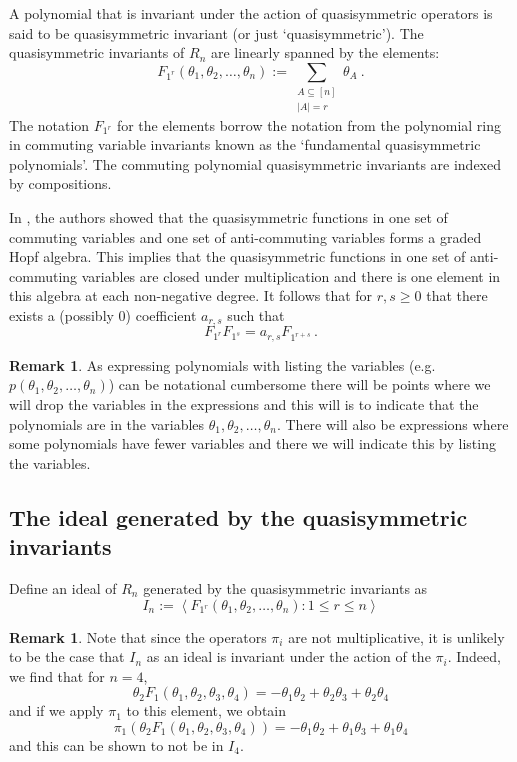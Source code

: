 \documentclass[11pt]{amsart}
\theoremstyle{definition}
\newtheorem{remark}[theorem]{Remark}
\numberwithin{equation}{section}
\begin{document}
A polynomial that is invariant under the action of quasisymmetric operators
is said to be quasisymmetric invariant (or just `quasisymmetric').
The quasisymmetric invariants of $R_n$ are
linearly spanned by the elements:
\begin{equation}\label{eq:defF}
F_{1^r}(\theta_1, \theta_2, \ldots, \theta_n) := \sum_{\substack{A \subseteq [n]\\|A|=r}} \theta_A~.
\end{equation}
The notation $F_{1^r}$ for the elements borrow the notation from the
polynomial ring in commuting variable invariants known as the `fundamental
quasisymmetric polynomials'.  The commuting polynomial quasisymmetric
invariants are indexed by compositions.

In \cite{FLP}, the authors showed that the quasisymmetric functions in
one set of commuting variables and one set of anti-commuting variables
forms a graded Hopf algebra.  This implies that the quasisymmetric functions
in one set of anti-commuting variables are closed under multiplication
and there is one element in this algebra at each non-negative degree.
It follows that for $r, s \geq0$ that there exists a (possibly $0$)
coefficient $a_{r,s}$ such that
\begin{equation}\label{eq:qsalg}
F_{1^r} F_{1^s} = a_{r,s} F_{1^{r+s}}\,.
\end{equation}

\begin{remark}
As expressing polynomials with listing the variables
(e.g. $p(\theta_1, \theta_2, \ldots, \theta_n)$) can be notational cumbersome
there will be points where we will drop the variables in the expressions
and this will is to indicate that the polynomials are in the
variables $\theta_1, \theta_2, \ldots, \theta_n$.  There will also
be expressions where some polynomials have fewer variables and there
we will indicate this by listing the variables.
\end{remark}

\subsection{The ideal generated by the quasisymmetric invariants}

Define an ideal of $R_n$ generated by the quasisymmetric invariants as
\[
I_n := \left< F_{1^r}(\theta_1, \theta_2, \ldots, \theta_n) : 1 \leq r \leq n \right>
\]

\begin{remark}
Note that since the operators $\pi_i$ are not multiplicative, it
is unlikely to be the case that $I_n$ as an ideal is invariant
under the action of the $\pi_i$.  Indeed, we find that for $n=4$,
\[
\theta_2 F_{1}(\theta_1, \theta_2, \theta_3, \theta_4) =
-\theta_1 \theta_2 + \theta_2 \theta_3 + \theta_2 \theta_4
\]
and if we apply $\pi_1$ to this element, we obtain
\[
\pi_1(\theta_2 F_{1}(\theta_1, \theta_2, \theta_3, \theta_4)) =
-\theta_1 \theta_2 + \theta_1 \theta_3 + \theta_1 \theta_4
\]
and this can be shown to not be in $I_4$.
\end{remark}
\end{document}
